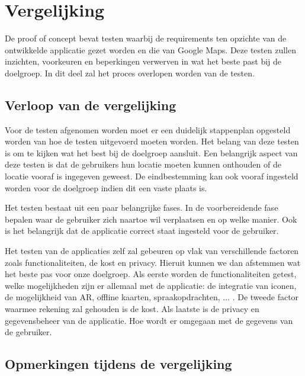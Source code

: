 \section{Vergelijking}
\label{sec:vergelijking}



De proof of concept bevat testen waarbij de requirements ten opzichte van de ontwikkelde applicatie gezet worden en die van Google Maps. Deze testen zullen inzichten, voorkeuren en beperkingen verwerven in wat het beste past bij de doelgroep. In dit deel zal het proces overlopen worden van de testen.

\subsection{Verloop van de vergelijking}
\label{sec:verloop van de vergelijking}

Voor de testen afgenomen worden moet er een duidelijk stappenplan opgesteld worden van hoe de testen uitgevoerd moeten worden. Het belang van deze testen is om te kijken wat het best bij de doelgroep aansluit. Een belangrijk aspect van deze testen is dat de gebruikers hun locatie moeten kunnen onthouden of de locatie vooraf is ingegeven geweest. De eindbestemming kan ook vooraf ingesteld worden voor de doelgroep indien dit een vaste plaats is. \newline

Het testen bestaat uit een paar belangrijke fases. In de voorbereidende fase bepalen waar de gebruiker zich naartoe wil verplaatsen en op welke manier. Ook is het belangrijk dat de applicatie correct staat ingesteld voor de gebruiker.\newline

Het testen van de applicaties zelf zal gebeuren op vlak van verschillende factoren zoals functionaliteiten, de kost en privacy. Hieruit kunnen we dan afstemmen wat het beste pas voor onze doelgroep. Als eerste worden de functionaliteiten getest, welke mogelijkheden zijn er allemaal met de applicatie: de integratie van iconen, de mogelijkheid van AR, offline kaarten, spraakopdrachten, ... . De tweede factor waarmee rekening zal gehouden is de kost. Als laatste is de privacy en gegevensbeheer van de applicatie. Hoe wordt er omgegaan met de gegevens van de gebruiker.

\subsection{Opmerkingen tijdens de vergelijking}
\label{sec:opmerkingen tijdens de testen}

